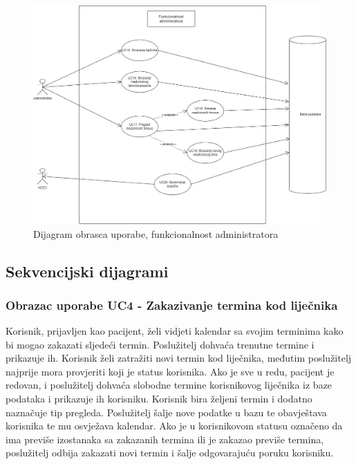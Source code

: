 				    \begin{figure}[H]
			            \includegraphics[width=\textwidth]{slike/administrator_usecase.png} %
			            \caption{Dijagram obrasca uporabe, funkcionalnost administratora}
			            \label{fig:promjene2} %
		            \end{figure}
		            
		            \eject
		            
			\subsection{Sekvencijski dijagrami}
				
				\subsubsection{Obrazac uporabe UC4 - Zakazivanje termina kod liječnika}
				Korisnik, prijavljen kao pacijent, želi vidjeti kalendar sa svojim terminima kako bi mogao zakazati sljedeći termin. Poslužitelj dohvaća trenutne termine i prikazuje ih. Korisnik želi zatražiti novi termin kod liječnika, međutim poslužitelj najprije mora provjeriti koji je status korisnika. Ako je sve u redu, pacijent je redovan, i poslužitelj dohvaća slobodne termine korisnikovog liječnika iz baze podataka i prikazuje ih korisniku. Korisnik bira željeni termin i dodatno naznačuje tip pregleda. Poslužitelj šalje nove podatke u bazu te obavještava korisnika te mu osvježava  kalendar. Ako je u korisnikovom statusu označeno da ima previše izostanaka sa zakazanih termina ili je zakazao previše termina, poslužitelj odbija zakazati novi termin i šalje odgovarajuću poruku korisniku.
				
